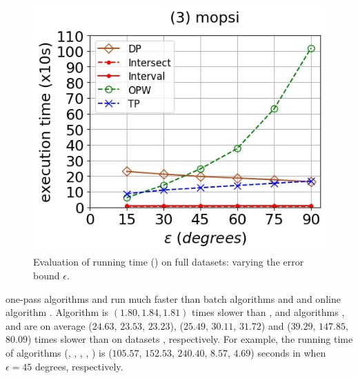 {\begin{figure}[tb!]
	\includegraphics[scale=0.250]{Figures/Exp-DAD-time-epsilon-mopsi.jpg}		
	\vspace{-2ex}
	\caption{\small Evaluation of running time (\dad) on full datasets: varying the error bound $\epsilon$.}\label{fig:time-epsilon-dad}
	\vspace{-2ex}
\end{figure}




 {one-pass algorithms \intersec and \interval run much faster than batch algorithms \tpa and \dpa and online algorithm \opwa.}
%
%
Algorithm \interval is $(1.80, 1.84, 1.81)$ times slower than \intersec, and algorithms \tpa, \dpa and \opwa are on average
($24.63$, $23.53$, $23.23$), ($25.49$, $30.11$, $31.72$) and ($39.29$, $147.85$, $80.09$)
times slower than \intersec on datasets \dSets, respectively.
%
For example, the running time of algorithms
(\tpa, \dpa, \opwa, \interval, \intersec) is ($105.57$, $152.53$, $240.40$, $8.57$, $4.69$) seconds in \mopsi when
$\epsilon=45$ degrees, respectively.



}
